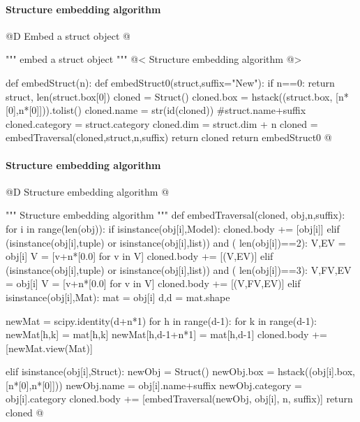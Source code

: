 \documentclass[11pt,oneside]{article}    %
\begin{document}
\paragraph{Structure embedding algorithm}
@D Embed a struct object
@{""" embed a struct object """
@< Structure embedding algorithm  @>

def embedStruct(n):
    def embedStruct0(struct,suffix="New"):
        if n==0: 
            return struct, len(struct.box[0])
        cloned = Struct()
        cloned.box = hstack((struct.box, [n*[0],n*[0]])).tolist()
        cloned.name = str(id(cloned))  #struct.name+suffix
        cloned.category = struct.category
        cloned.dim = struct.dim + n
        cloned = embedTraversal(cloned,struct,n,suffix) 
        return cloned
    return embedStruct0
@}

\paragraph{Structure embedding algorithm}
@D Structure embedding algorithm 
@{""" Structure embedding algorithm """
def embedTraversal(cloned, obj,n,suffix):
    for i in range(len(obj)):
        if isinstance(obj[i],Model): 
            cloned.body += [obj[i]]
        elif (isinstance(obj[i],tuple) or isinstance(obj[i],list)) and (
                len(obj[i])==2):
            V,EV = obj[i]
            V = [v+n*[0.0] for v in V]
            cloned.body  += [(V,EV)]
        elif (isinstance(obj[i],tuple) or isinstance(obj[i],list)) and (
                len(obj[i])==3):
            V,FV,EV = obj[i]
            V = [v+n*[0.0] for v in V]
            cloned.body  += [(V,FV,EV)]
        elif isinstance(obj[i],Mat): 
            mat = obj[i]
            d,d = mat.shape

            newMat = scipy.identity(d+n*1)
            for h in range(d-1): 
                for k in range(d-1): 
                    newMat[h,k] = mat[h,k]
                newMat[h,d-1+n*1] = mat[h,d-1]
            cloned.body  +=  [newMat.view(Mat)]

        elif isinstance(obj[i],Struct):
            newObj = Struct()
            newObj.box = hstack((obj[i].box, [n*[0],n*[0]]))
            newObj.name = obj[i].name+suffix
            newObj.category = obj[i].category
            cloned.body  += [embedTraversal(newObj, obj[i], n, suffix)]
    return cloned
@}
\end{document}
